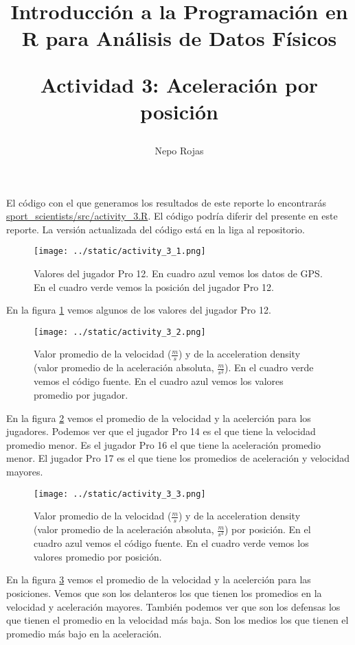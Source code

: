 

\author{Nepo Rojas}

\title{Introducción a la Programación en R para Análisis de Datos Físicos \\ \begin{large}
    Actividad 3: Aceleración por posición \end{large}}



\maketitle

El código con el que generamos los resultados de este reporte lo encontrarás
\href{https://github.com/niesfutbol/sport_scientists/blob/develop/src/activity_3.R}{sport\_scientists/src/activity\_3.R}.
El código podría diferir del presente en este reporte. La versión actualizada del código está en la
liga al repositorio.

\begin{figure}[H]
    \centering
    \texttt{[image: ../static/activity\_3\_1.png]}
    \caption{
        Valores del jugador Pro 12. En cuadro azul vemos los datos de GPS. En el cuadro verde vemos
        la posición del jugador Pro 12.
    }
    \label{fig:1}
    \end{figure}
En la figura \ref{fig:1} vemos algunos de los valores del jugador Pro 12.

\begin{figure}[H]
    \centering
    \texttt{[image: ../static/activity\_3\_2.png]}
    \caption{
        Valor promedio de la velocidad ($\frac{m}{s}$) y de la acceleration density (valor
        promedio de la aceleración absoluta, $\frac{m}{s^2}$). En el cuadro verde vemos el código
        fuente. En el cuadro azul vemos los valores promedio por jugador.
    }
    \label{fig:2}
    \end{figure}
En la figura \ref{fig:2} vemos el promedio de la velocidad y la acelerción para los jugadores.
Podemos ver que el jugador Pro 14 es el que tiene la velocidad promedio menor.
Es el jugador Pro 16 el que tiene la aceleración promedio menor.
El jugador Pro 17 es el que tiene los promedios de aceleración y velocidad mayores.

\begin{figure}[H]
    \centering
    \texttt{[image: ../static/activity\_3\_3.png]}
    \caption{
        Valor promedio de la velocidad ($\frac{m}{s}$) y de la acceleration density (valor
        promedio de la aceleración absoluta, $\frac{m}{s^2}$) por posición. En el cuadro azul vemos el código
        fuente. En el cuadro verde vemos los valores promedio por posición.
    }
    \label{fig:3}
    \end{figure}
En la figura \ref{fig:3} vemos el promedio de la velocidad y la acelerción para las posiciones.
Vemos que son los delanteros los que tienen los promedios en la velocidad y aceleración mayores.
También podemos ver que son los defensas los que tienen el promedio en la velocidad más baja.
Son los medios los que tienen el promedio más bajo en la aceleración.


